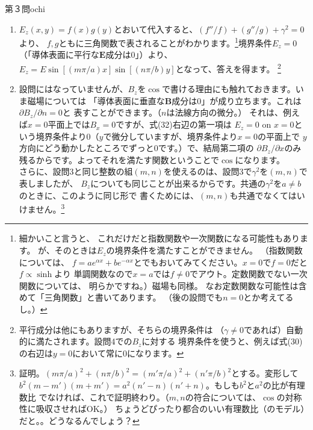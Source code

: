\begin{answer}{第３問}{ochi}
\begin{enumerate}
  さて、これを見ると下の二つの方程式を解いて$E_z,B_z$を求めてしまえば、
  残りは全部わかるようです。境界条件も、上の式を使えば全て$E_z,B_z$に対するものとして
  表すことができます。（例えば$E_x$に対する境界条件があれば、1番目の式を使って。）これ以降
  、$E_z,B_z$に絞って解析を進めているのは、そのためです。

\item
  $E_z(x,y)=f(x)g(y)$とおいて代入すると、$(f''/f)+(g''/g)+\gamma^2=0$より、
  $f,g$ともに三角関数で表されることがわかります。\footnote{細かいこと言うと、
  これだけだと指数関数や一次関数になる可能性もあります。
  が、そのときは$E_z$の境界条件を満たすことができません。
  （指数関数については、
  $f=ae^{\alpha x}+be^{-\alpha x}$とでもおいてみてください。$x=0$で$f=0$だと$f\propto \sinh$より
  単調関数なので$x=a$では$f\neq 0$でアウト。定数関数でない一次関数については、
  明らかですね。）磁場も同様。
  なお定数関数な可能性は含めて「三角関数」と書いてあります。
  （後の設問でも$n=0$とか考えてるし。）
  }境界条件$E_z=0$（「導体表面に平行な$\mathbf{E}$成分は0」）より、
  $E_z=E\sin[ (m\pi/a)x ]\sin[ (n\pi/b)y]$となって、答えを得ます。
  \footnote{平行成分は他にもありますが、そちらの境界条件は
  （$\gamma\neq 0$であれば）自動的に満たされます。設問4での$B_z$に対する
  境界条件を使うと、例えば式(30)の右辺は$y=0$において常に$0$になります。}\\

\item
  設問にはなっていませんが、$B_z$を$\cos$で書ける理由にも触れておきます。いま磁場については
  「導体表面に垂直な$\mathbf{B}$成分は0」が成り立ちます。これは$\partial B_z/\partial n=0$と
  表すことができます。（$n$は法線方向の微分。）
  それは、例えば$x=0$平面上では$B_x=0$ですが、式(32)右辺の第一項は
  $E_z=0$ on $x=0$という境界条件より$0$（$y$で微分していますが、境界条件より$x=0$の平面上で
  $y$方向にどう動かしたところでずっと$0$です。）で、結局第二項の
  $\partial B_z/\partial x$のみ残るからです。よってそれを満たす関数ということで$\cos$になります。\\

  さらに、設問3と同じ整数の組$(m,n)$を使えるのは、設問3で$\gamma^2$を$(m,n)$で表しましたが、
  $B_z$についても同じことが出来るからです。共通の$\gamma^2$を$a\neq b$のときに、このように同じ形で
  書くためには、$(m,n)$も共通でなくてはいけません。\footnote{証明。$(m\pi/a)^2+(n\pi/b)^2=(m'\pi/a)^2
  +(n'\pi/b)^2$とする。変形して$b^2(m-m')(m+m')=a^2(n'-n)(n'+n)$。もしも$b^2$と$a^2$の比が有理数比
  でなければ、これで証明終わり。（$m,n$の符合については、$\cos$の対称性に吸収させればOK。）
  ちょうどぴったり都合のいい有理数比（のモデル）だと。。どうなるんでしょう？}\\


\end{enumerate}
\end{answer}
